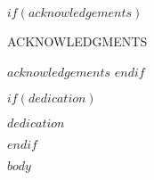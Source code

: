 \documentclass[12pt,letterpaper]{report}
\begin{document}
$if(acknowledgements)$
\begin{center}
  ACKNOWLEDGMENTS
\end{center}
\doublespace
$acknowledgements$
\clearpage
$endif$

$if(dedication)$
\begin{center}
   \doublespace
   {\itshape $dedication$}
\end{center}
\clearpage
$endif$

\tableofcontents
\newpage
\renewcommand{\cftlabel}{Table}
\listoftables
\newpage
{}
\renewcommand{\cftlabel}{Figure}
\listoffigures
\doublespace
{}

$body$

{\singlespace

}
\renewcommand{\chaptername}{APPENDIX}
\appendix
\end{document}

